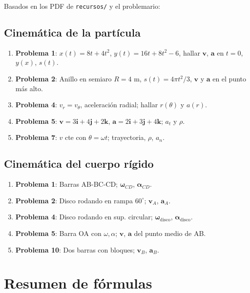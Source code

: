\documentclass[12pt,a4paper]{article}
\begin{document}
Basados en los PDF de \texttt{recursos/} y el problemario:

\subsection*{Cinemática de la partícula}

\begin{enumerate}
    \item \textbf{Problema 1}: $x(t)=8t+4t^2$, $y(t)=16t+8t^2-6$,
          hallar $\mathbf{v}$, $\mathbf{a}$ en $t=0$, $y(x)$, $s(t)$.
    \item \textbf{Problema 2}: Anillo en semiaro $R=4$ m,
          $s(t)=4\pi t^2/3$, $\mathbf{v}$ y $\mathbf{a}$ en el punto más alto.
    \item \textbf{Problema 4}: $v_r = v_\theta$, aceleración radial;
          hallar $r(\theta)$ y $a(r)$.
    \item \textbf{Problema 5}: $\mathbf{v}=3\mathbf{i}+4\mathbf{j}+2\mathbf{k}$,
          $\mathbf{a}=2\mathbf{i}+3\mathbf{j}+4\mathbf{k}$; $a_t$ y $\rho$.
    \item \textbf{Problema 7}: $v$ cte con $\theta = \omega t$;
          trayectoria, $\rho$, $a_n$.
\end{enumerate}

\subsection*{Cinemática del cuerpo rígido}

\begin{enumerate}
    \item \textbf{Problema 1}: Barras AB-BC-CD; $\boldsymbol{\omega}_{CD}$,
          $\boldsymbol{\alpha}_{CD}$.
    \item \textbf{Problema 2}: Disco rodando en rampa $60^\circ$;
          $\mathbf{v}_A$, $\mathbf{a}_A$.
    \item \textbf{Problema 4}: Disco rodando en sup. circular;
          $\boldsymbol{\omega}_{\text{disco}}$, $\boldsymbol{\alpha}_{\text{disco}}$.
    \item \textbf{Problema 5}: Barra OA con $\omega,\alpha$;
          $\mathbf{v}$, $\mathbf{a}$ del punto medio de AB.
    \item \textbf{Problema 10}: Dos barras con bloques;
          $\mathbf{v}_B$, $\mathbf{a}_B$.
\end{enumerate}

\newpage

\section{Resumen de fórmulas}
\end{document}
